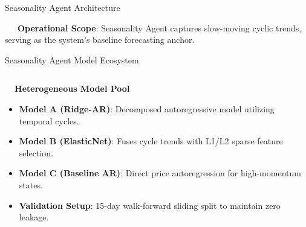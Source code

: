 \documentclass{beamer}
\begin{document}
\begin{frame}{Seasonality Agent Architecture}
\vspace{0.15cm}
\begin{tcolorbox}[enhanced, colback=primaryblue!4, colframe=primaryblue!30, boxrule=0.35pt,
  arc=3.5pt, width=0.98\textwidth, left=4pt, right=4pt, top=2.5pt, bottom=2.5pt, boxsep=0pt,
  halign=center, shadow={0.5pt}{-0.5pt}{0pt}{black!8}]
    \fontsize{5.5pt}{6.5pt}\selectfont
    \textcolor{primaryDark}{~~~\textbf{Operational Scope}: Seasonality Agent captures slow-moving cyclic trends, serving as the system's baseline forecasting anchor.}
\end{tcolorbox}
\end{frame}

\begin{frame}{Seasonality Agent Model Ecosystem}
\vspace{-0.2cm}

\begin{columns}[T]
    \begin{column}{0.48\textwidth}
        \begin{smallcard}[0.98\textwidth, top=3pt, bottom=3pt, left=4pt, right=4pt, boxsep=0.5pt]
            \centering \textbf{\textcolor{primaryDark}{\small {}~~Heterogeneous Model Pool}}
            \vspace{0.08cm}
            \fontsize{6.8pt}{8.2pt}\selectfont
            \begin{itemize}\setlength\itemsep{4pt}\setlength\parskip{0pt}
                \item \textbf{Model A (Ridge-AR)}: Decomposed autoregressive model utilizing temporal cycles.
                \item \textbf{Model B (ElasticNet)}: Fuses cycle trends with L1/L2 sparse feature selection.
                \item \textbf{Model C (Baseline AR)}: Direct price autoregression for high-momentum states.
                \item \textbf{Validation Setup}: 15-day walk-forward sliding split to maintain zero leakage.
            \end{itemize}
        \end{smallcard}
    \end{column}
    

\end{columns}
\end{frame}
\end{document}
